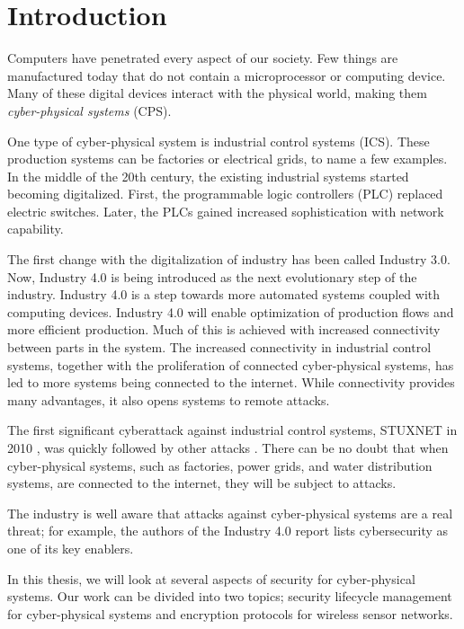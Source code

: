 \chapter{Introduction}
Computers have penetrated every aspect of our society. Few things are manufactured today that do not contain a microprocessor or computing device. Many of these digital devices interact with the physical world, making them \emph{cyber-physical systems} (CPS).

One type of cyber-physical system is industrial control systems (ICS). These production systems can be factories or electrical grids, to name a few examples. In the middle of the 20th century, the existing industrial systems started becoming digitalized. First, the programmable logic controllers (PLC) replaced electric switches. Later, the PLCs gained increased sophistication with network capability. 

The first change with the digitalization of industry has been called Industry 3.0. Now, Industry 4.0 is being introduced as the next evolutionary step of the industry. Industry 4.0 is a step towards more automated systems coupled with computing devices. Industry 4.0 will enable optimization of production flows and more efficient production. Much of this is achieved with increased connectivity between parts in the system. The increased connectivity in industrial control systems, together with the proliferation of connected cyber-physical systems, has led to more systems being connected to the internet. While connectivity provides many advantages, it also opens systems to remote attacks. 

The first significant cyberattack against industrial control systems, STUXNET in 2010 \cite{falliere2011w32}, was quickly followed by other attacks \cite{case2016analysis} \cite{giles2019triton}. There can be no doubt that when cyber-physical systems, such as factories, power grids, and water distribution systems, are connected to the internet, they will be subject to attacks.

The industry is well aware that attacks against cyber-physical systems are a real threat; for example, the authors of the Industry 4.0 report \cite{kagermann2013recommendations} lists cybersecurity as one of its key enablers.

In this thesis, we will look at several aspects of security for cyber-physical systems. Our work can be divided into two topics; security lifecycle management for cyber-physical systems and encryption protocols for wireless sensor networks.

